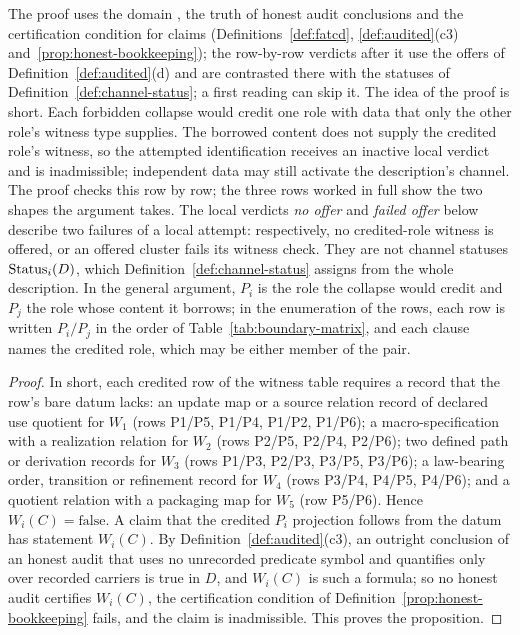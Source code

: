 The proof uses the domain \FATCD{}, the truth of honest audit conclusions and the certification condition for claims (Definitions~\ref{def:fatcd}, \ref{def:audited}(c3) and~\ref{prop:honest-bookkeeping}); the row-by-row verdicts after it use the offers of Definition~\ref{def:audited}(d) and are contrasted there with the statuses of Definition~\ref{def:channel-status}; a first reading can skip it. The idea of
the proof is short. Each forbidden collapse would credit one
role with data that only the other role's witness type supplies. The
borrowed content does not supply the credited role's witness, so the
attempted identification receives an inactive local verdict and is
inadmissible; independent data may still activate the description's
channel. The proof checks this
row by row; the three rows worked in full show the two shapes the
argument takes. The local verdicts \emph{no offer} and \emph{failed offer} below describe
two failures of a local attempt: respectively, no credited-role witness is
offered, or an offered cluster fails its witness check. They are not channel
statuses \(\operatorname{Status}_{i}\!\left(D\right)\), which Definition~\ref{def:channel-status} assigns
from the whole description. In the general argument, \(P_i\) is the role the collapse
would credit and \(P_j\) the role whose content it borrows; in the
enumeration of the rows, each row is written \(P_i/P_j\) in the order of
Table~\ref{tab:boundary-matrix}, and each clause names the credited role,
which may be either member of the pair.


\begin{proof}
In short, each credited row of the witness table requires a record that the
row's bare datum lacks: an update map or a source relation record of declared use quotient for \(W_1\) (rows P1/P5, P1/P4, P1/P2, P1/P6); a
macro-specification with a realization relation for \(W_2\) (rows P2/P5,
P2/P4, P2/P6); two defined path or derivation records for \(W_3\) (rows
P1/P3, P2/P3, P3/P5, P3/P6); a law-bearing order, transition or refinement
record for \(W_4\) (rows P3/P4, P4/P5, P4/P6); and a quotient relation with a
packaging map for \(W_5\) (row P5/P6). Hence \(W_i(C)=\mathrm{false}\). A claim that the credited \(P_i\) projection
follows from the datum has statement \(W_i(C)\). By
Definition~\ref{def:audited}(c3), an outright conclusion of an honest audit that
uses no unrecorded predicate symbol and quantifies only over recorded carriers
is true in \(D\), and \(W_i(C)\) is such a formula; so no honest audit certifies
\(W_i(C)\), the certification condition of
Definition~\ref{prop:honest-bookkeeping} fails, and the claim is inadmissible.
This proves the proposition.
\end{proof}

